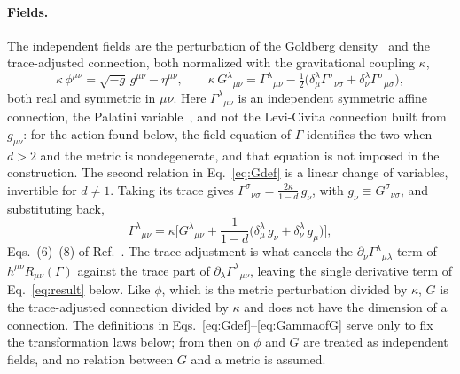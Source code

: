 \documentclass[prd,aps,preprint,superscriptaddress,nofootinbib,amsmath,amssymb,eqsecnum]{revtex4-2}
\begin{document}
\paragraph{Fields.} The independent fields are the perturbation of the Goldberg
density~\cite{Goldberg1958} and
the trace-adjusted connection, both normalized with the gravitational coupling $\kappa$,
\begin{equation}
\kappa\,\phi^{\mu\nu}=\sqrt{-g}\,g^{\mu\nu}-\eta^{\mu\nu},\qquad
\kappa\,G^{\lambda}{}_{\mu\nu}=\Gamma^{\lambda}{}_{\mu\nu}
-\tfrac12\big(\delta^{\lambda}_{\mu}\Gamma^{\sigma}{}_{\nu\sigma}
+\delta^{\lambda}_{\nu}\Gamma^{\sigma}{}_{\mu\sigma}\big),
\label{eq:Gdef}
\end{equation}
both real and symmetric in $\mu\nu$. Here $\Gamma^{\lambda}{}_{\mu\nu}$ is an independent
symmetric affine connection, the Palatini variable~\cite{Palatini1919,Ferraris1982}, and not
the Levi-Civita connection built
from $g_{\mu\nu}$: for the action found below, the field equation of $\Gamma$ identifies the
two when $d>2$ and the metric is nondegenerate, and that equation is not imposed in the
construction. The second relation in Eq.~\eqref{eq:Gdef} is a linear change of variables,
invertible for $d\neq1$. Taking its trace
gives $\Gamma^{\sigma}{}_{\nu\sigma}=\frac{2\kappa}{1-d}\,g_\nu$, with
$g_\nu\equiv G^{\sigma}{}_{\nu\sigma}$, and substituting back,
\begin{equation}
\Gamma^{\lambda}{}_{\mu\nu}=\kappa\Big[G^{\lambda}{}_{\mu\nu}
+\frac{1}{1-d}\big(\delta^{\lambda}_{\mu}\,g_\nu+\delta^{\lambda}_{\nu}\,g_\mu\big)\Big],
\label{eq:GammaofG}
\end{equation}
Eqs.~(6)--(8) of Ref.~\cite{BrandtMcKeon2015}. The trace adjustment is what cancels the
$\partial_\nu\Gamma^{\lambda}{}_{\mu\lambda}$ term of $h^{\mu\nu}R_{\mu\nu}(\Gamma)$ against
the trace part of $\partial_\lambda\Gamma^{\lambda}{}_{\mu\nu}$, leaving the single derivative
term of Eq.~\eqref{eq:result} below. Like $\phi$, which is the metric perturbation divided by
$\kappa$, $G$ is the trace-adjusted connection divided by $\kappa$ and does not have the
dimension of a connection. The definitions in
Eqs.~\eqref{eq:Gdef}--\eqref{eq:GammaofG} serve only to fix the transformation laws below;
from then on $\phi$ and $G$ are treated as independent fields, and no relation between $G$ and
a metric is assumed.
\end{document}
